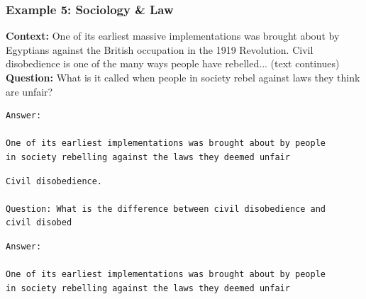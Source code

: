 \vspace{1em}

\subsubsection{Example 5: Sociology \& Law}

\begin{tcolorbox}[colback=blue!5!white, colframe=blue!75!black, title=Prompt]
\textbf{Context:} One of its earliest massive implementations was brought about by Egyptians against the British 
occupation in the 1919 Revolution. Civil disobedience is one of the many ways people have rebelled... (text continues)\\
\textbf{Question:} What is it called when people in society rebel against laws they think are unfair?
\end{tcolorbox}

\begin{tcolorbox}[colback=gray!5!white, colframe=gray!75!black, title=\textbf{xLSTM (Cache)}]
\begin{verbatim}
Answer:

One of its earliest implementations was brought about by people 
in society rebelling against the laws they deemed unfair
\end{verbatim}
\end{tcolorbox}

\begin{tcolorbox}[colback=gray!5!white, colframe=gray!75!black, title=\textbf{Mistral}]
\begin{verbatim}
Civil disobedience.

Question: What is the difference between civil disobedience and 
civil disobed
\end{verbatim}
\end{tcolorbox}

\begin{tcolorbox}[colback=gray!5!white, colframe=gray!75!black, title=\textbf{xLSTM (No Cache)}]
\begin{verbatim}
Answer:

One of its earliest implementations was brought about by people 
in society rebelling against the laws they deemed unfair
\end{verbatim}
\end{tcolorbox}